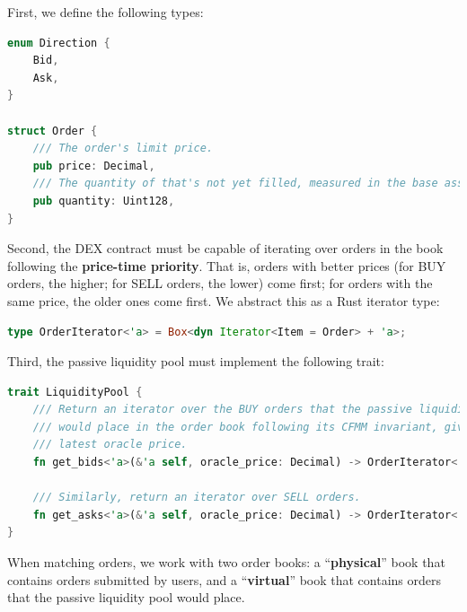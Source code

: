 \documentclass{article}
\begin{document}
First, we define the following types:

\begin{minipage}{\linewidth}
  \begin{lstlisting}[language=rust]
enum Direction {
    Bid,
    Ask,
}

struct Order {
    /// The order's limit price.
    pub price: Decimal,
    /// The quantity of that's not yet filled, measured in the base asset.
    pub quantity: Uint128,
}
  \end{lstlisting}
\end{minipage}

Second, the DEX contract must be capable of iterating over orders in the book following the \textbf{price-time priority}. That is, orders with better prices (for BUY orders, the higher; for SELL orders, the lower) come first; for orders with the same price, the older ones come first. We abstract this as a Rust iterator type:

\begin{minipage}{\linewidth}
  \vspace*{0.1in}
  \begin{lstlisting}[language=rust]
type OrderIterator<'a> = Box<dyn Iterator<Item = Order> + 'a>;
  \end{lstlisting}
\end{minipage}

Third, the passive liquidity pool must implement the following trait:

\begin{minipage}{\linewidth}
  \vspace*{0.1in}
  \begin{lstlisting}[language=rust]
trait LiquidityPool {
    /// Return an iterator over the BUY orders that the passive liquidity pool
    /// would place in the order book following its CFMM invariant, given the
    /// latest oracle price.
    fn get_bids<'a>(&'a self, oracle_price: Decimal) -> OrderIterator<'a>;

    /// Similarly, return an iterator over SELL orders.
    fn get_asks<'a>(&'a self, oracle_price: Decimal) -> OrderIterator<'a>;
}
  \end{lstlisting}
\end{minipage}

When matching orders, we work with two order books: a ``\textbf{physical}'' book that contains orders submitted by users, and a ``\textbf{virtual}'' book that contains orders that the passive liquidity pool would place.
\end{document}
